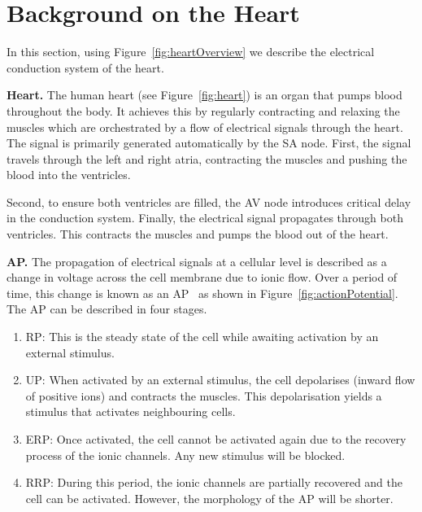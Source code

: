 \section{Background on the Heart }
\begin{figure*}[htbp]
	\centering
	
	\caption{Electrical conduction systems of the heart}
	\label{fig:heartOverview}
\end{figure*}

In this section, using Figure~\ref{fig:heartOverview} we 
describe the electrical conduction system of the heart.

\noindent \textbf{Heart.}
The human heart (see Figure~\ref{fig:heart})
 is an organ that pumps blood throughout the body.
It achieves this by regularly contracting and relaxing the muscles
which are orchestrated by a flow of electrical signals through the heart.
The signal is primarily generated automatically by the \ac{SA} node.
First, the signal travels through the left and right atria, contracting 
the muscles and pushing the blood into the ventricles.
 
Second, to ensure both ventricles are filled, 
the \ac{AV} node introduces critical delay 
in the conduction system.   
Finally, the electrical signal propagates through 
both ventricles. This contracts the muscles and pumps the blood out of the heart.


\noindent \textbf{\acf{AP}.} 
The propagation of electrical signals at a cellular level 
is described as a change in  voltage 
across the cell membrane due to ionic flow. Over a period of time, 
this change is known as an \acf{AP}~\cite{chen14} as shown in Figure~\ref{fig:actionPotential}. 
The \ac{AP} can be described in four stages.
\begin{enumerate}
	\item \acf{RP}: This is the steady state of the cell while awaiting 
					activation by an external stimulus.
	\item \acf{UP}: When activated by an external stimulus, 
					the cell depolarises (inward flow of positive ions) and 
					contracts the muscles. This depolarisation yields 
					a stimulus that activates neighbouring cells.
	\item \acf{ERP}: Once activated, the cell cannot be activated again 
					 due to the recovery process of the ionic channels. 
					 Any new stimulus will be blocked. 
	\item \acf{RRP}: During this period, the ionic channels are partially recovered
					 and the cell can be activated. However, the morphology
					 of the \ac{AP} will be shorter.
	
\end{enumerate}


